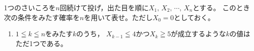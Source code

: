 \documentclass[../../main.tex]{subfiles}
\begin{document}
1つのさいころを$n$回続けて投げ，出た目を順に$X_1, \, X_2, \, \cdots, \, X_n$とする。
このとき次の条件をみたす確率を$n$を用いて表せ。ただし$X_0=0$としておく。
\begin{enumerate}
  \item[条件：]$1 \leqq k \leqq n$をみたす$k$のうち，
    $X_{k-1}\leqq4$かつ$X_k\geqq5$が成立するような$k$の値はただ1つである。
\end{enumerate}
\end{document}
